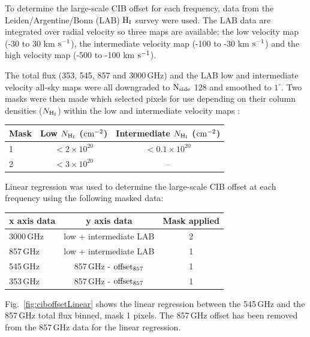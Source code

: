 \documentclass[a4paper,fleqn,usenatbib]{mnras}
\begin{document}
To determine the large-scale CIB offset for each frequency, data from the Leiden/Argentine/Bonn (LAB) $\rm{H_{I}}$ survey \citep{lab} were used. The LAB data are integrated over radial velocity so three maps are available: the low velocity map (-30 to 30 km $\rm{s}^{-1}$), the intermediate velocity map (-100 to -30 km $\rm{s}^{-1}$) and the high velocity map (-500 to -100 km $\rm{s}^{-1}$). 

The total flux (353, 545, 857 and 3000\,GHz) and the LAB low and intermediate velocity all-sky maps were all downgraded to $\rm{N_{side}}$ 128 and smoothed to $1^{\circ}$. Two masks were then made which selected pixels for use depending on their column densities ($N_{\rm{H_{I}}}$) within the low and intermediate velocity maps :

\begin{tabular}{ l | c | c  }
\hline
  Mask & Low $N_{\rm{H_{I}}}$ ($\rm{cm}^{-2}$) & Intermediate $N_{\rm{H_{I}}}$ ($\rm{cm}^{-2}$)  \\
  \hline
  1 &  $< 2 \times 10^{20}$  & $ < 0.1 \times 10^{20}$ \\
  2 &  $ < 3 \times 10^{20}$  & -- \\
  \hline
\end{tabular}

Linear regression was used to determine the large-scale CIB offset at each frequency using the following masked data: 

\begin{tabular}{ l | c | c  }
\hline
 x axis data & y axis data & Mask applied \\
  \hline
  3000\,GHz & low + intermediate LAB & 2 \\ 
  857\,GHz &  low + intermediate LAB & 1 \\
  545\,GHz & 857\,GHz - $\rm{offset}_{857}$ & 1 \\
  353\,GHz & 857\,GHz - $\rm{offset}_{857}$  & 1 \\
  \hline
\end{tabular}

Fig.~\ref{fig:ciboffsetLinear} shows the linear regression between the 545\,GHz and the 857\,GHz total flux binned, mask 1 pixels. The 857\,GHz offset has been removed from the 857\,GHz data for the linear regression. 
\end{document}
